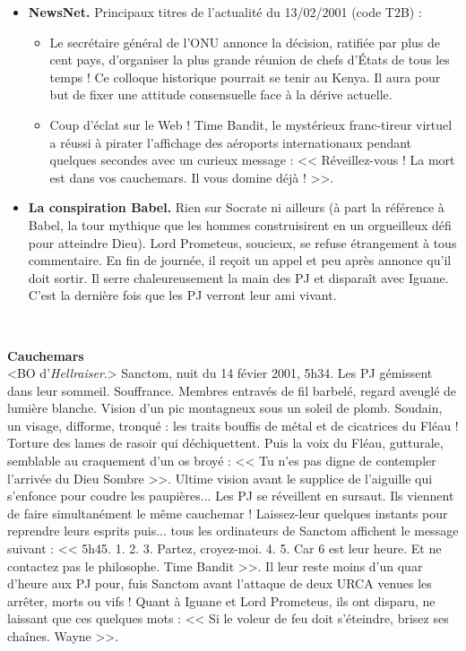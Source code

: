 \documentclass[11pt,twoside,a4paper]{book}
\begin{document}
\begin{itemize}
	\item \textbf{NewsNet.} Principaux titres de l'actualit{\'e} du 13/02/2001 (code T2B) :
	\begin{itemize}
		\item Le secr{\'e}taire g{\'e}n{\'e}ral de l'ONU annonce la d{\'e}cision, ratifi{\'e}e par plus de cent pays, d'organiser la plus grande r{\'e}union de chefs d'{\'E}tats de tous les temps ! Ce colloque historique pourrait se tenir au Kenya. Il aura pour but de fixer une attitude consensuelle face {\`a} la d{\'e}rive actuelle.
		\item Coup d'{\'e}clat sur le Web ! Time Bandit, le myst{\'e}rieux franc-tireur virtuel a r{\'e}ussi {\`a} pirater l'affichage des a{\'e}roports internationaux pendant quelques secondes avec un curieux message : << R{\'e}veillez-vous ! La mort est dans vos cauchemars. Il vous domine d{\'e}j{\`a} ! >>.
	\end{itemize}
	\item \textbf{La conspiration Babel.} Rien sur Socrate ni ailleurs ({\`a} part la r{\'e}f{\'e}rence {\`a} Babel, la tour mythique que les hommes construisirent en un orgueilleux d{\'e}fi pour atteindre Dieu). Lord Prometeus, soucieux, se refuse {\'e}trangement {\`a} tous commentaire. En fin de journ{\'e}e, il re\c{c}oit un appel et peu apr{\`e}s annonce qu'il doit sortir. Il serre chaleureusement la main des PJ et dispara{\^i}t avec Iguane. C'est la derni{\`e}re fois que les PJ verront leur ami vivant.
\end{itemize}~\\
\setlength\parindent{0pt}

\clearpage

\textbf{\large Cauchemars}~\\

<BO d'\emph{Hellraiser}.> Sanctom, nuit du 14 f{\'e}vier 2001, 5h34. Les PJ g{\'e}missent dans leur sommeil. Souffrance. Membres entrav{\'e}s de fil barbel{\'e}, regard aveugl{\'e} de lumi{\`e}re blanche. Vision d'un pic montagneux sous un soleil de plomb. Soudain, un visage, difforme, tronqu{\'e} : les traits bouffis de m{\'e}tal et de cicatrices du Fl{\'e}au ! Torture des lames de rasoir qui d{\'e}chiquettent. Puis la voix du Fl{\'e}au, gutturale, semblable au craquement d'un os broy{\'e} : << Tu n'es pas digne de contempler l'arriv{\'e}e du Dieu Sombre >>. Ultime vision avant le supplice de l'aiguille qui s'enfonce pour coudre les paupi{\`e}res... Les PJ se r{\'e}veillent en sursaut. Ils viennent de faire simultan{\'e}ment le m{\^e}me cauchemar ! Laissez-leur quelques instants pour reprendre leurs esprits puis... tous les ordinateurs de Sanctom affichent le message suivant : << 5h45. 1. 2. 3. Partez, croyez-moi. 4. 5. Car 6 est leur heure. Et ne contactez pas le philosophe. Time Bandit >>. Il leur reste moins d'un quar d'heure aux PJ pour, fuis Sanctom avant l'attaque de deux URCA venues les arr{\^e}ter, morts ou vifs ! Quant {\`a} Iguane et Lord Prometeus, ils ont disparu, ne laissant que ces quelques mots : << Si le voleur de feu doit s'{\'e}teindre, brisez ses cha{\^i}nes. Wayne >>.~\\
\end{document}
